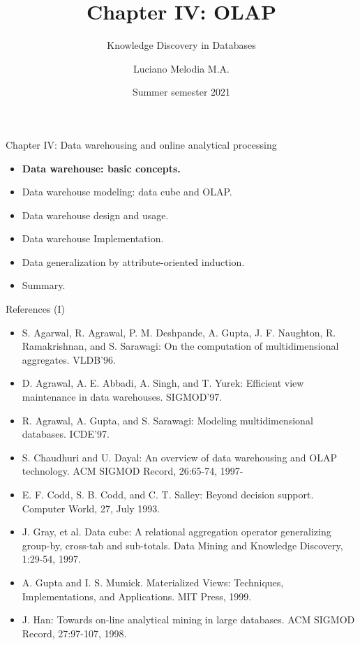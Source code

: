 \documentclass[aspectratio=169,t]{beamer}
\title[KDD]{Chapter IV: OLAP}
\subtitle{Knowledge Discovery in Databases}
\author[L.~Melodia]{Luciano Melodia M.A.}
\institute[Department]{Evolutionary Data Management, Friedrich-Alexander University Erlangen-Nürnberg}
\date{Summer semester 2021}
\begin{document}
  \maketitle

  { 
    \begin{frame}{Chapter IV: Data warehousing and online analytical processing}
        \begin{itemize}
            \item \textbf{Data warehouse: basic concepts.}
            \item Data warehouse modeling: data cube and OLAP.
            \item Data warehouse design and usage.
            \item Data warehouse Implementation.
            \item Data generalization by attribute-oriented induction.
            \item Summary.
        \end{itemize}
    \end{frame}
  }

  {
    \begin{frame}{References (I)}
    \begin{itemize}
      \item S. Agarwal, R. Agrawal, P. M. Deshpande, A. Gupta, J. F. Naughton, R. Ramakrishnan, and S. Sarawagi: On the computation of multidimensional aggregates. VLDB'96.
      \item D. Agrawal, A. E. Abbadi, A. Singh, and T. Yurek: Efficient view maintenance in data warehouses. SIGMOD'97.
      \item R. Agrawal, A. Gupta, and S. Sarawagi: Modeling multidimensional databases.  ICDE'97.
      \item {\color{airforceblue}S. Chaudhuri and U. Dayal: An overview of data warehousing and OLAP technology. ACM SIGMOD Record, 26:65-74, 1997-}
      \item E. F. Codd, S. B. Codd, and C. T. Salley: Beyond decision support. Computer World, 27, July 1993.
      \item J. Gray, et al. Data cube: A relational aggregation operator generalizing group-by, cross-tab and sub-totals. Data Mining and Knowledge Discovery, 1:29-54, 1997.
      \item A. Gupta and I. S. Mumick.  Materialized Views: Techniques, Implementations, and Applications. MIT Press, 1999.
      \item J. Han:  Towards on-line analytical mining in large databases. ACM SIGMOD Record, 27:97-107, 1998.
    \end{itemize}
    \end{frame}
  }
\end{document}
